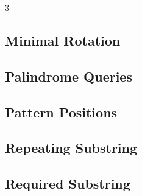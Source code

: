 \documentclass[8pt]{extarticle}
\begin{document}
\begin{multicols*}{3}
\subsection{Minimal Rotation}
\begin{caixaenunciado}

\end{caixaenunciado}
\vspace{0.3cm}


\subsection{Palindrome Queries}
\begin{caixaenunciado}

\end{caixaenunciado}
\vspace{0.3cm}


\subsection{Pattern Positions}
\begin{caixaenunciado}

\end{caixaenunciado}
\vspace{0.3cm}


\subsection{Repeating Substring}
\begin{caixaenunciado}

\end{caixaenunciado}
\vspace{0.3cm}


\subsection{Required Substring}
\begin{caixaenunciado}

\end{caixaenunciado}
\vspace{0.3cm}



\end{multicols*}
\end{document}
